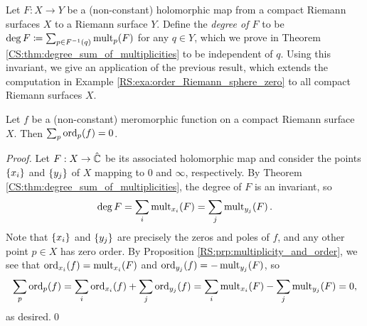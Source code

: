 \documentclass[../Moduli_Spaces_of_Riemann_Surfaces.tex]{subfiles}
\begin{document}
    \begin{remark}
        Let $F:X\to Y$ be a (non-constant) holomorphic map from a compact Riemann surfaces $X$ to a Riemann surface $Y$. Define the \textit{degree of $F$} to be $\deg F\coloneqq\sum_{p\in F^{-1}\left(q\right)}\operatorname{mult}_p\!\left(F\right)$ for any $q\in Y$, which we prove in Theorem \ref{CS:thm:degree_sum_of_multiplicities} to be independent of $q$. Using this invariant, we give an application of the previous result, which extends the computation in Example \ref{RS:exa:order_Riemann_sphere_zero} to all compact Riemann surfaces $X$.\exqed
    \end{remark}
    \begin{proposition}\label{RS:prp:order_compact_zero}
        Let $f$ be a (non-constant) meromorphic function on a compact Riemann surface $X$. Then $\sum_p\operatorname{ord}_p\!\left(f\right)=0$.
    \end{proposition}
    \begin{proof}
        Let $F:X\to\hat{\mathbb{C}}$ be its associated holomorphic map and consider the points $\left\{x_i\right\}$ and $\left\{y_j\right\}$ of $X$ mapping to $0$ and $\infty$, respectively. By Theorem \ref{CS:thm:degree_sum_of_multiplicities}, the degree of $F$ is an invariant, so
        \begin{equation*}
            \deg F=\sum_i\operatorname{mult}_{x_i}\!\left(F\right)=\sum_j\operatorname{mult}_{y_j}\!\left(F\right).
        \end{equation*}
        Note that $\left\{x_i\right\}$ and $\left\{y_j\right\}$ are precisely the zeros and poles of $f$, and any other point $p\in X$ has zero order. By Proposition \ref{RS:prp:multiplicity_and_order}, we see that $\operatorname{ord}_{x_i}\!\left(f\right)=\operatorname{mult}_{x_i}\!\left(F\right)$ and $\operatorname{ord}_{y_j}\!\left(f\right)=-\operatorname{mult}_{y_j}\!\left(F\right)$, so
        \begin{equation*}
            \sum_p\operatorname{ord}_p\!\left(f\right)=\sum_i\operatorname{ord}_{x_i}\!\left(f\right)+\sum_j\operatorname{ord}_{y_j}\!\left(f\right)=\sum_i\operatorname{mult}_{x_i}\!\left(F\right)-\sum_j\operatorname{mult}_{y_j}\!\left(F\right)=0,
        \end{equation*}
        as desired.\qed
    \end{proof}
\end{document}

